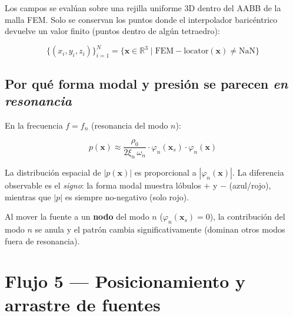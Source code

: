 \documentclass[11pt,a4paper]{article}
\begin{document}
Los campos se evalúan sobre una rejilla uniforme 3D dentro del AABB de la
malla FEM.  Solo se conservan los puntos donde el interpolador baricéntrico
devuelve un valor finito (puntos dentro de algún tetraedro):

\[
  \{(x_i, y_i, z_i)\}_{i=1}^N
  = \bigl\{ \mathbf{x} \in \mathbb{R}^3 \mid
    \mathrm{FEM{-}locator}(\mathbf{x}) \neq \mathrm{NaN} \bigr\}
\]

\subsection*{Por qué forma modal y presión se parecen \emph{en resonancia}}

En la frecuencia $f = f_n$ (resonancia del modo $n$):

\[
  p(\mathbf{x}) \approx
  \frac{\rho_0}{2\xi_n\,\omega_n} \cdot
  \varphi_n(\mathbf{x}_s) \cdot \varphi_n(\mathbf{x})
\]

La distribución espacial de $|p(\mathbf{x})|$ es proporcional a $|\varphi_n(\mathbf{x})|$.
La diferencia observable es el \emph{signo}: la forma modal muestra lóbulos
$+$ y $-$ (azul/rojo), mientras que $|p|$ es siempre no-negativo (solo rojo).

Al mover la fuente a un \textbf{nodo} del modo $n$ ($\varphi_n(\mathbf{x}_s)=0$),
la contribución del modo $n$ se anula y el patrón cambia significativamente
(dominan otros modos fuera de resonancia).

\section{Flujo 5 — Posicionamiento y arrastre de fuentes}
\end{document}
